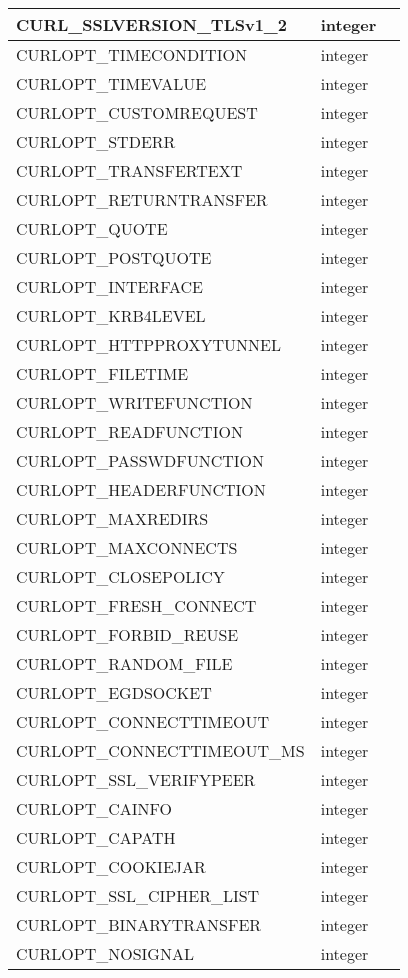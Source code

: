 \begin{longtable}{|m{150pt}|m{40pt}|m{200pt}|}
\hline
CURL\_SSLVERSION\_TLSv1\_2&integer&\\
\hline
CURLOPT\_TIMECONDITION&integer&\\
\hline
CURLOPT\_TIMEVALUE&integer&\\
\hline
CURLOPT\_CUSTOMREQUEST&integer&\\
\hline
CURLOPT\_STDERR&integer&\\
\hline
CURLOPT\_TRANSFERTEXT&integer&\\
\hline
CURLOPT\_RETURNTRANSFER&integer&\\
\hline
CURLOPT\_QUOTE&integer&\\
\hline
CURLOPT\_POSTQUOTE&integer&\\
\hline
CURLOPT\_INTERFACE&integer&\\
\hline
CURLOPT\_KRB4LEVEL&integer&\\
\hline
CURLOPT\_HTTPPROXYTUNNEL&integer&\\
\hline
CURLOPT\_FILETIME&integer&\\
\hline
CURLOPT\_WRITEFUNCTION&integer&\\
\hline
CURLOPT\_READFUNCTION&integer&\\
\hline
CURLOPT\_PASSWDFUNCTION&integer&\\
\hline
CURLOPT\_HEADERFUNCTION&integer&\\
\hline
CURLOPT\_MAXREDIRS&integer&\\
\hline
CURLOPT\_MAXCONNECTS&integer&\\
\hline
CURLOPT\_CLOSEPOLICY&integer&\\
\hline
CURLOPT\_FRESH\_CONNECT&integer&\\
\hline
CURLOPT\_FORBID\_REUSE&integer&\\
\hline
CURLOPT\_RANDOM\_FILE&integer&\\
\hline
CURLOPT\_EGDSOCKET&integer&\\
\hline
CURLOPT\_CONNECTTIMEOUT&integer&\\
\hline
CURLOPT\_CONNECTTIMEOUT\_MS&integer&\\
\hline
CURLOPT\_SSL\_VERIFYPEER&integer&\\
\hline
CURLOPT\_CAINFO&integer&\\
\hline
CURLOPT\_CAPATH&integer&\\
\hline
CURLOPT\_COOKIEJAR&integer&\\
\hline
CURLOPT\_SSL\_CIPHER\_LIST&integer&\\
\hline
CURLOPT\_BINARYTRANSFER&integer&\\
\hline
CURLOPT\_NOSIGNAL&integer&\\

\end{longtable}

